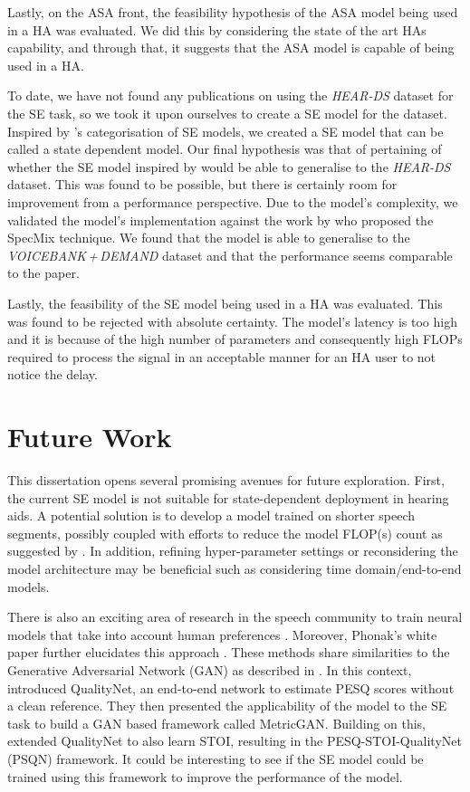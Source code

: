 \documentclass[logo,bsc,singlespacing,parskip,online]{infthesis}
\newcommand{\heards}{\textit{HEAR-DS}\xspace}
\newcommand{\vbd}{\textit{VOICEBANK\,+\,DEMAND}\xspace}
\begin{document}
Lastly, on the ASA front, 
the feasibility hypothesis 
of the ASA model being used in a HA was 
evaluated. We did this by considering 
the state of the art HAs capability, and through that, 
it suggests that the ASA model is capable of being used 
in a HA.

To date, we have not found any publications on 
using the \heards dataset for the SE task, so we 
took it upon ourselves to create a SE model 
for the dataset. Inspired by \citet{katagiri_handbook_2000}'s
categorisation of SE models, we created a SE model that can 
be called a state dependent model. Our final hypothesis was 
that of pertaining of whether the SE model inspired 
by \citet{tan18_interspeech} would be able to 
generalise to the \heards dataset. This was found 
to be possible, but there is certainly room for improvement 
from a performance perspective. Due to the model's 
complexity, we validated the model's implementation 
against the work by \citet{kim_specmix_2021} who proposed 
the SpecMix technique. We found that the model is 
able to generalise to the \vbd dataset and that the 
performance seems comparable to the paper.

Lastly, the feasibility of the SE model being used 
in a HA was evaluated. This was found to be rejected 
with absolute certainty. The model's latency is too high and 
it is because of the high number of parameters and 
consequently high FLOPs required to process the 
signal in an acceptable manner for an HA user to not 
notice the delay.

\section{Future Work}
\label{sec:future-work}
This dissertation opens several promising avenues for future exploration.
First, the current SE model is not suitable for state-dependent deployment
in hearing aids. A potential solution is to develop a model trained on
shorter speech segments, possibly coupled with efforts to reduce the model
FLOP(s) count as suggested by \citet{liu_simple_2023}. In addition, refining
hyper-parameter settings or reconsidering the model architecture may be 
beneficial such as considering time domain/end-to-end models.

There is also an exciting area of research in 
the speech community to train neural models 
that take into account human preferences \citep{Zhang2024SpeechAlignAS}.
Moreover, Phonak's white paper further elucidates
this approach \citep{Hasemann2024PhonakSphere}.
These methods share similarities to the Generative Adversarial Network (GAN)  
as described in \citet{Bai2022PerceptualLoss}. 
In this context, \citet{Fu2018QualityNet} introduced 
QualityNet, an end-to-end network to estimate PESQ scores without a clean
reference. They then presented the applicability of the model to the SE task
to build a GAN based framework called MetricGAN.
Building on this, \citet{Bai2022PerceptualLoss} extended QualityNet
to also learn STOI, resulting in the PESQ-STOI-QualityNet (PSQN) framework.
It could be interesting to see if the SE model could be trained using 
this framework to improve the performance of the model.
\end{document}
